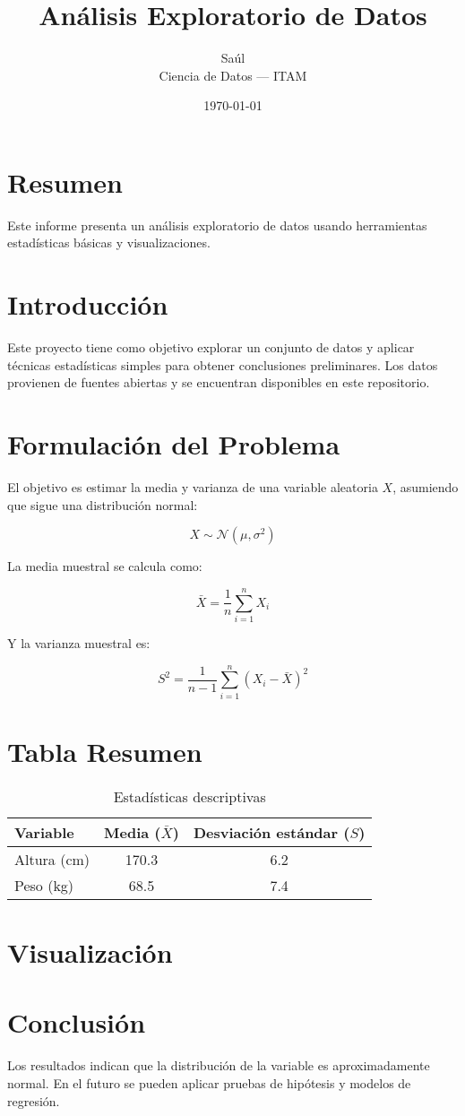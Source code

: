 \documentclass[a4paper,12pt]{article}
\title{Análisis Exploratorio de Datos}
\author{Saúl \\ Ciencia de Datos — ITAM}
\date{\today}
\begin{document}
\maketitle

\section*{Resumen}

Este informe presenta un análisis exploratorio de datos usando herramientas estadísticas básicas y visualizaciones.  

\section{Introducción}

Este proyecto tiene como objetivo explorar un conjunto de datos y aplicar técnicas estadísticas simples para obtener conclusiones preliminares. Los datos provienen de fuentes abiertas y se encuentran disponibles en este repositorio.

\section{Formulación del Problema}

El objetivo es estimar la media y varianza de una variable aleatoria \( X \), asumiendo que sigue una distribución normal:

\[
X \sim \mathcal{N}(\mu, \sigma^2)
\]

La media muestral se calcula como:

\[
\bar{X} = \frac{1}{n} \sum_{i=1}^n X_i
\]

Y la varianza muestral es:

\[
S^2 = \frac{1}{n - 1} \sum_{i=1}^n (X_i - \bar{X})^2
\]

\section{Tabla Resumen}

\begin{table}[h!]
\centering
\begin{tabular}{@{}lcc@{}}
\toprule
Variable & Media (\(\bar{X}\)) & Desviación estándar (\(S\)) \\
\midrule
Altura (cm) & 170.3 & 6.2 \\
Peso (kg)   & 68.5  & 7.4 \\
\bottomrule
\end{tabular}
\caption{Estadísticas descriptivas}
\end{table}

\section{Visualización}

\section{Conclusión}

Los resultados indican que la distribución de la variable es aproximadamente normal. En el futuro se pueden aplicar pruebas de hipótesis y modelos de regresión.
\end{document}
